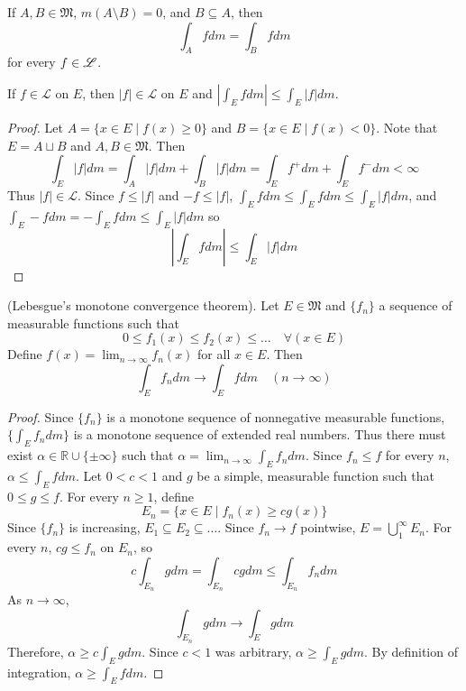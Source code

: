 \documentclass[11pt]{article}
\begin{document}
  \begin{corollary} If $A, B \in \mathfrak{M}$, $m(A \setminus B) = 0$, and $B \subseteq A$, then $$\int_A f dm = \int_B f dm$$ for every $f \in \mathscr{L}$.
  \end{corollary}

  \begin{theorem} If $f \in \mathscr{L}$ on $E$, then $|f| \in \mathscr{L}$ on $E$ and $|\int_E f dm| \le \int_E |f| dm$.
  \end{theorem}
  \begin{proof}
    Let $A = \{ x \in E \mid f(x) \ge 0 \}$ and $B = \{ x \in E \mid f(x) < 0 \}$. Note that $E = A \sqcup B$ and $A, B \in \mathfrak{M}$. Then $$\int_E |f| dm = \int_A |f| dm + \int_B |f| dm = \int_E f^+ dm + \int_E f^- dm < \infty$$Thus $|f| \in \mathscr{L}$. Since $f \le |f|$ and $-f \le |f|$, $\int_E f dm \le \int_E f dm \le \int_E |f| dm$, and $\int_E -f dm = - \int_E f dm \le \int_E |f| dm$ so $$\left| \int_E f dm \right| \le \int_E |f| dm$$
  \end{proof}

  \begin{theorem} (Lebesgue's monotone convergence theorem). Let $E \in \mathfrak{M}$ and $\{ f_n \}$ a sequence of measurable functions such that $$0 \le f_1 (x) \le f_2(x) \le \dots \quad \forall (x \in E)$$Define $f(x) = \lim_{n \to \infty} f_n(x)$ for all $x \in E$. Then $$\int_E  f_n dm \to \int_E f dm \quad (n \to \infty)$$
  \end{theorem}
  \begin{proof}
    Since $\{ f_n \}$ is a monotone sequence of nonnegative measurable functions,  $\{ \int_E f_n dm \}$ is a monotone sequence of extended real numbers. Thus there must exist $\alpha \in \mathbb{R} \cup \{ \pm \infty \}$ such that $\alpha = \lim_{n \to \infty} \int_E f_n dm$. Since $f_n \le f$ for every $n$, $\alpha \le \int_E f dm$. 
    Let $0 < c < 1$ and $g$ be a simple, measurable function such that $0 \le g \le f$. For every $n \ge 1$, define $$E_n = \{ x \in E \mid f_n(x) \ge cg(x) \}$$Since $\{ f_n \}$ is increasing, $E_1 \subseteq E_2 \subseteq \dots$. Since $f_n \to f$ pointwise, $E = \bigcup_1^\infty E_n$. For every $n$, $cg \le f_n$ on $E_n$, so $$c \int_{E_n} g dm = \int_{E_n} cg dm \le \int_{E_n} f_n dm$$As $n \to \infty$, $$\int_{E_n} g dm \to \int_E g dm$$Therefore, $\alpha \ge c \int_{E} g dm$. Since $c < 1$ was arbitrary, $\alpha \ge \int_E g dm$. By definition of integration, $\alpha \ge \int_E  f dm$.
  \end{proof}
\end{document}
